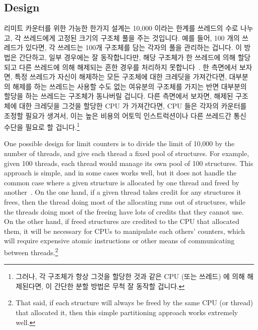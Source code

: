 \subsection{Design}

리미트 카운터를 위한 가능한 한가지 설계는 10,000 이라는 한계를 쓰레드의 수로
나누고, 각 쓰레드에게 고정된 크기의 구조체 풀을 주는 것입니다.
예를 들어, 100 개의 쓰레드가 있다면, 각 쓰레드는 100개 구조체를 담는 각자의
풀을 관리하는 겁니다.
이 방법은 간단하고, 일부 경우에는 잘 동작합니다만, 해당 구조체가 한 쓰레드에
의해 할당되고 다른 쓰레드에 의해 해제되는 흔한 경우를 처리하지
못합니다~\cite{McKenney93}.
한 측면에서 보자면, 특정 쓰레드가 자신이 해제하는 모든 구조체에 대한 크레딧을
가져간다면, 대부분의 해제를 하는 쓰레드는 사용할 수도 없는 여유분의 구조체를
가지는 반면 대부분의 할당을 하는 쓰레드는 구조체가 동나버릴 겁니다.
다른 측면에서 보자면, 해제된 구조체에 대한 크레딧을 그것을 할당한 CPU 가
가져간다면, CPU 들은 각자의 카운터를 조정할 필요가 생겨서, 이는 높은 비용의
어토믹 인스트럭션이나 다른 쓰레드간 통신 수단을 필요로 할 겁니다.\footnote{
	그러나, 각 구조체가 항상 그것을 할당한 것과 같은 CPU (또는 쓰레드) 에
	의해 해제된다면, 이 간단한 분할 방법은 무척 잘 동작할 겁니다.}

\iffalse

One possible design for limit counters is to divide the limit of 10,000
by the number of threads, and give each thread a fixed pool of structures.
For example, given 100 threads, each thread would manage its own pool
of 100 structures.
This approach is simple, and in some cases works well, but it does not
handle the common case where a given structure is allocated by one
thread and freed by another~\cite{McKenney93}.
On the one hand, if a given thread takes credit for any structures it
frees, then the thread doing most of the allocating runs out
of structures, while the threads doing most of the freeing have lots
of credits that they cannot use.
On the other hand, if freed structures are credited to the CPU that
allocated them, it will be necessary for CPUs to manipulate each
others' counters, which will require expensive atomic instructions
or other means of communicating between threads.\footnote{
	That said, if each structure will always be freed
	by the same CPU (or thread) that allocated it, then
	this simple partitioning approach works extremely well.}

